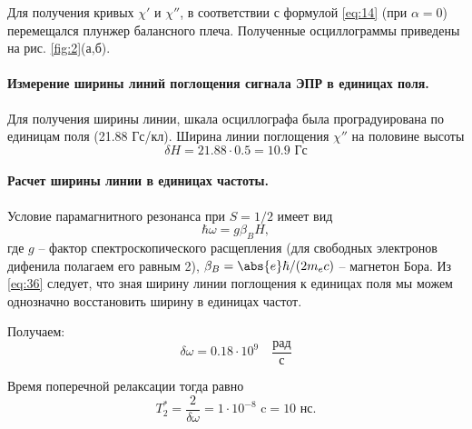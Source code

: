 Для получения кривых $\chi'$ и $\chi''$, в соответствии с формулой \eqref{eq:14} (при $\alpha = 0$) перемещался плунжер балансного плеча. Полученные осциллограммы
приведены на рис. \ref{fig:2}(а,б).

\paragraph{Измерение ширины линий поглощения сигнала ЭПР в единицах поля.}%
Для получения ширины линии, шкала осциллографа была проградуирована по единицам поля (21.88
Гс/кл). Ширина линии поглощения $\chi''$ на половине высоты 
\begin{equation}
    \delta H = 21.88 \cdot 0.5 = 10.9 \text{ Гс}
    \label{eq:}
\end{equation}

\paragraph{Расчет ширины линии в единицах частоты.}
Условие парамагнитного резонанса при $S = 1 / 2$ имеет вид
 \begin{equation}
    \label{eq:36}
    \hbar \omega = g \beta_B H,
\end{equation}
где $g$ -- фактор спектроскопического расщепления (для свободных электронов дифенила полагаем его равным 2),  $\beta_B = \abs{e} \hbar / (2 m_e c)$ -- магнетон Бора.
Из \eqref{eq:36} следует, что зная ширину линии поглощения к единицах поля мы можем однозначно восстановить ширину в единицах частот. 

Получаем:
\begin{equation}
    \label{eq:}
    \delta \omega = 0.18 \cdot 10^{9} \quad \frac{\text{рад}}{\text{с}}
\end{equation}

Время поперечной релаксации тогда равно
\begin{equation}
    \label{eq:}
    T_2^* = \frac{2}{\delta \omega} = 1 \cdot 10^{-8} \text{ c} = 10 \text{ нс.} 
\end{equation}
